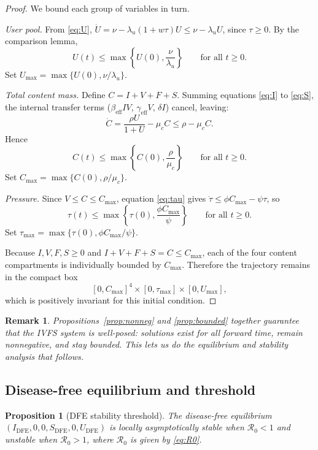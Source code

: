 \documentclass[11pt]{article}
\newtheorem{proposition}{Proposition}
\newtheorem{remark}{Remark}
\begin{document}
\begin{proof}
We bound each group of variables in turn.

\emph{User pool.} From \eqref{eq:U}, $\dot{U} = \nu - \lambda_u(1+w\tau)U \leq \nu - \lambda_u U$, since $\tau \geq 0$. By the comparison lemma,
\[
U(t) \leq \max\!\left\{U(0), \frac{\nu}{\lambda_u}\right\}
\qquad \text{for all } t \geq 0.
\]
Set $U_{\max} = \max\{U(0), \nu/\lambda_u\}$.

\emph{Total content mass.} Define $C = I + V + F + S$. Summing equations \eqref{eq:I} to \eqref{eq:S}, the internal transfer terms ($\beta_{\mathrm{eff}} IV$, $\gamma_{\mathrm{eff}} V$, $\delta I$) cancel, leaving:
\[
\dot{C} = \frac{\rho U}{1+U} - \mu_c C \leq \rho - \mu_c C.
\]
Hence
\[
C(t) \leq \max\!\left\{C(0), \frac{\rho}{\mu_c}\right\}
\qquad \text{for all } t \geq 0.
\]
Set $C_{\max} = \max\{C(0), \rho/\mu_c\}$.

\emph{Pressure.} Since $V \leq C \leq C_{\max}$, equation \eqref{eq:tau} gives $\dot{\tau} \leq \phi C_{\max} - \psi\tau$, so
\[
\tau(t) \leq \max\!\left\{\tau(0), \frac{\phi C_{\max}}{\psi}\right\}
\qquad \text{for all } t \geq 0.
\]
Set $\tau_{\max} = \max\{\tau(0), \phi C_{\max}/\psi\}$.

Because $I,V,F,S \geq 0$ and $I+V+F+S=C \leq C_{\max}$, each of the four content compartments is individually bounded by $C_{\max}$. Therefore the trajectory remains in the compact box
\[
[0,C_{\max}]^4 \times [0,\tau_{\max}] \times [0,U_{\max}],
\]
which is positively invariant for this initial condition.
\end{proof}

\begin{remark}
Propositions~\ref{prop:nonneg} and \ref{prop:bounded} together guarantee that the IVFS system is well-posed: solutions exist for all forward time, remain nonneg\-ative, and stay bounded. This lets us do the equilibrium and stability analysis that follows.
\end{remark}

\subsection{Disease-free equilibrium and threshold}

\begin{proposition}[DFE stability threshold]
\label{prop:dfe}
The disease-free equilibrium $(I_{\mathrm{DFE}}, 0, 0, S_{\mathrm{DFE}}, 0, U_{\mathrm{DFE}})$ is locally asymptotically stable when $\mathcal{R}_0 < 1$ and unstable when $\mathcal{R}_0 > 1$, where $\mathcal{R}_0$ is given by \eqref{eq:R0}.
\end{proposition}
\end{document}
